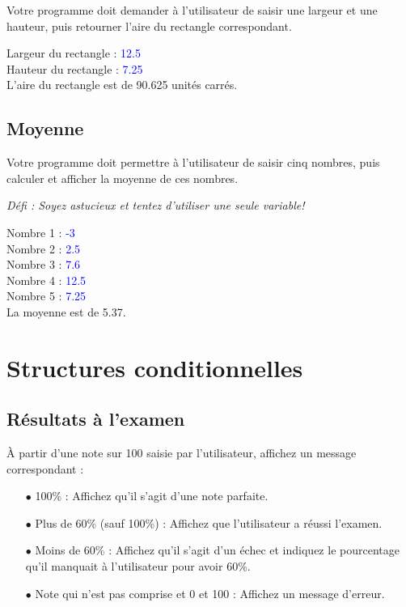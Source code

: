 \documentclass[12pt]{article}
\newenvironment{console}
	{
	\tcolorbox[title={Sortie console}, sharp corners = south, boxsep = 1.5mm]{} \tt
	}{\endtcolorbox}
\begin{document}
Votre programme doit demander à l'utilisateur de saisir une largeur et une hauteur, puis retourner l'aire du rectangle correspondant.

\begin{console}
Largeur du rectangle :  \textcolor{blue}{12.5} \\
Hauteur du rectangle :  \textcolor{blue}{7.25} \\[\baselineskip]
L'aire du rectangle est de 90.625 unités carrés.
\end{console}

%
%
%
%

\subsection{Moyenne}

Votre programme doit permettre à l’utilisateur de saisir cinq nombres, puis calculer et afficher la moyenne de ces nombres.

\textit{Défi : Soyez astucieux et tentez d'utiliser une seule variable!}

\begin{console}
Nombre 1 :  \textcolor{blue}{-3} \\
Nombre 2 :  \textcolor{blue}{2.5} \\
Nombre 3 :  \textcolor{blue}{7.6} \\
Nombre 4 :  \textcolor{blue}{12.5} \\
Nombre 5 :  \textcolor{blue}{7.25} \\[\baselineskip]
La moyenne est de 5.37.
\end{console}



%
%

\section{Structures conditionnelles}


\subsection{Résultats à l'examen}

À partir d'une note sur 100 saisie par l'utilisateur, affichez un message correspondant :

\begin{itemize}
	\item[$\bullet$] 100\% : Affichez qu'il s'agit d'une note parfaite.
	\item[$\bullet$] Plus de 60\% (sauf 100\%) : Affichez que l'utilisateur a réussi l'examen.
	\item[$\bullet$] Moins de 60\% : Affichez qu'il s'agit d'un échec et indiquez le pourcentage qu'il manquait à l'utilisateur pour avoir 60\%.
	\item[$\bullet$] Note qui n'est pas comprise et 0 et 100 : Affichez un message d'erreur.
\end{itemize}
\end{document}
